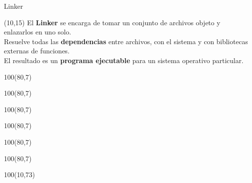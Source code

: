 \documentclass[aspectratio=169]{beamer}
\begin{document}
\begin{frame}[fragile,t]{Linker}
    \begin{textblock}{64}(10,15)
    El \textbf{Linker} se encarga de tomar un conjunto de archivos objeto y enlazarlos en uno solo.\\
    \bigskip
    Resuelve todas las \textbf{dependencias} entre archivos, con el sistema y con bibliotecas externas de funciones.\\
    \bigskip
    El resultado es un \textbf{programa ejecutable} para un sistema operativo particular.\\
    \end{textblock}
    \begin{textblock}{100}(80,7)  \end{textblock}
    \begin{textblock}{100}(80,7)  \end{textblock}
    \begin{textblock}{100}(80,7)  \end{textblock}
    \begin{textblock}{100}(80,7)  \end{textblock}
    \begin{textblock}{100}(80,7)  \end{textblock}
    \begin{textblock}{100}(80,7)  \end{textblock}
    \begin{textblock}{100}(10,73)
    \end{textblock}
\end{frame}
\end{document}
